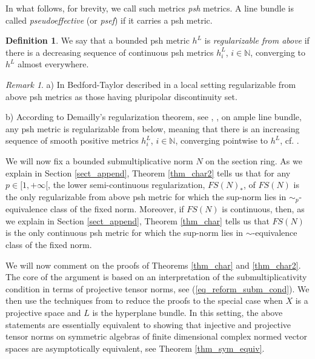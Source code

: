 \documentclass[12pt]{article}
\numberwithin{equation}{section}
\theoremstyle{theorem}
\theoremstyle{definition}
\newtheorem{defn}[thm]{Definition}
\theoremstyle{remark}
\newtheorem{rem}[thm]{Remark}
\newcommand{\nat}{\mathbb{N}}
\begin{document}
	In what follows, for brevity, we call such metrics \textit{psh} metrics.
	A line bundle is called \textit{pseudoeffective} (or \textit{psef}) if it carries a psh metric.
	\begin{defn}\label{defn_regul_above}
		We say that a bounded psh metric $h^L$ is \textit{regularizable from above} if there is a decreasing sequence of continuous psh metrics $h^L_i$, $i \in \nat$, converging to $h^L$ almost everywhere.
	\end{defn}
	\begin{rem}\label{rem_regul_above}
		a) In \cite[Theorem 2]{BedfordRegulBelow} Bedford-Taylor described in a local setting regularizable from above psh metrics as those having pluripolar discontinuity set. 
		\par 
		b) According to Demailly's regularization theorem, see \cite{Dem82}, \cite{DemRegul}, on ample line bundle, any psh metric is regularizable from below, meaning that there is an increasing sequence of smooth positive metrics $h^L_i$, $i \in \nat$, converging pointwise to $h^L$, cf. \cite[Theorem 8.1]{GuedZeriGeomAnal}. 
	\end{rem}
	We will now fix a bounded submultiplicative norm $N$ on the section ring.
	As we explain in Section \ref{sect_append}, Theorem \ref{thm_char2} tells us that for any $p \in [1, +\infty[$, the lower semi-continuous regularization, $FS(N)_*$, of $FS(N)$ is the only regularizable from above psh metric for which the sup-norm lies in $\sim_p$-equivalence class of the fixed norm.
	Moreover, if $FS(N)$ is continuous, then, as we explain in Section \ref{sect_append}, Theorem \ref{thm_char} tells us that $FS(N)$ is the only continuous psh metric for which the sup-norm lies in $\sim$-equivalence class of the fixed norm.
	\par 
	We will now comment on the proofs of Theorems \ref{thm_char} and \ref{thm_char2}.
	The core of the argument is based on an interpretation of the submultiplicativity condition in terms of projective tensor norms, see (\ref{eq_reform_subm_cond}).
	We then use the techniques from \cite{FinSecRing} to reduce the proofs to the special case when $X$ is a projective space and $L$ is the hyperplane bundle.
	In this setting, the above statements are essentially equivalent to showing that injective and projective tensor norms on symmetric algebras of finite dimensional complex normed vector spaces are asymptotically equivalent, see Theorem \ref{thm_sym_equiv}.
\end{document}
